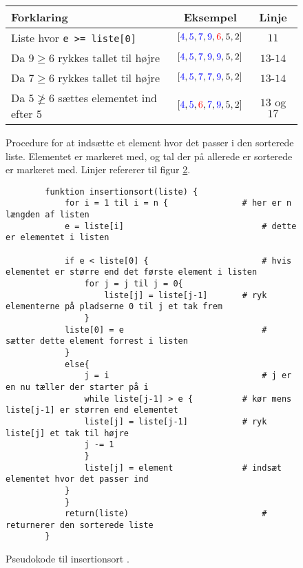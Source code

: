 \begin{figure}[h]
	\begin{center}
		\padtable
		\begin{tabular}{l|c|c}
			Forklaring & Eksempel & Linje\\
			\hline
			Liste hvor \verb|e >= liste[0]| & $[\color{blue}4\color{black},\color{blue}5\color{black},\color{blue}7\color{black},\color{blue}9\color{black},\color{red}6\color{black},5,2]$ &$11$\\
			Da $9 \geq 6$ rykkes tallet til højre & $[\color{blue}4\color{black},\color{blue}5\color{black},\color{blue}7\color{black},\color{blue}9\color{black},\color{blue}9\color{black},5,2]$ & $13$-$14$\\
			Da $7 \geq 6$ rykkes tallet til højre & $[\color{blue}4\color{black},\color{blue}5\color{black},\color{blue}7\color{black},\color{blue}7\color{black},\color{blue}9\color{black},5,2]$ & $13$-$14$\\
			Da $5 \ngeq 6$ sættes elementet ind efter $5$ & $[\color{blue}4\color{black},\color{blue}5\color{black},\color{red}6\color{black},\color{blue}7\color{black},\color{blue}9\color{black},5,2]$ & $13$ og $17$
		\end{tabular}
	\end{center}
	\vspace{-3mm}
	\caption{Procedure for at indsætte et element hvor det passer i den sorterede liste. Elementet er markeret med, og tal der på allerede er sorterede er markeret med. Linjer refererer til figur \ref{fig:Pseudokode til insertionsort}.}
	\label{fig:Indsæt element hvor det passer i listen}
\end{figure}

\begin{figure}[h]
	\begin{center}
		\begin{lstlisting}
		funktion insertionsort(liste) {
			for i = 1 til i = n {				# her er n længden af listen
			e = liste[i]	 						# dette er elementet i listen

			if e < liste[0] {						# hvis elementet er større end det første element i listen
				for j = j til j = 0{ 
					liste[j] = liste[j-1]		# ryk elementerne på pladserne 0 til j et tak frem
				}
			liste[0] = e 							# sætter dette element forrest i listen
			}
			else{
				j = i 								# j er en nu tæller der starter på i
				while liste[j-1] > e {			# kør mens liste[j-1] er størren end elementet
				liste[j] = liste[j-1] 			# ryk liste[j] et tak til højre
				j -= 1
				}
				liste[j] = element				# indsæt elementet hvor det passer ind
			}
			}			
			return(liste)							# returnerer den sorterede liste
		}
		\end{lstlisting}
	\end{center}
	\vspace{-5mm}
	\caption{Pseudokode til insertionsort \cite[s. 104]{aogd}.}
	\label{fig:Pseudokode til insertionsort}
\end{figure}



